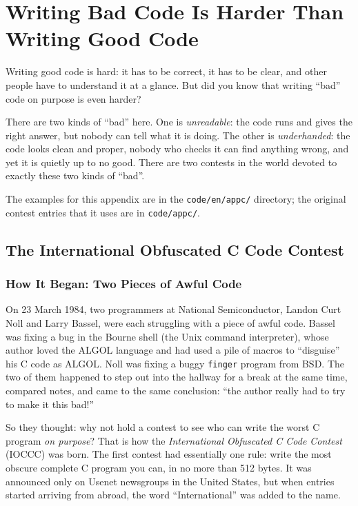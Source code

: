 \chapter{Writing Bad Code Is Harder Than Writing Good Code}
\label{app:evil-code}

Writing good code is hard: it has to be correct, it has to be clear, and other people have to understand it at a glance. But did you know that writing ``bad'' code on purpose is even harder?

There are two kinds of ``bad'' here. One is \emph{unreadable}: the code runs and gives the right answer, but nobody can tell what it is doing. The other is \emph{underhanded}: the code looks clean and proper, nobody who checks it can find anything wrong, and yet it is quietly up to no good. There are two contests in the world devoted to exactly these two kinds of ``bad''.

The examples for this appendix are in the \texttt{code/en/appc/} directory; the original contest entries that it uses are in \texttt{code/appc/}.

\section{The International Obfuscated C Code Contest}

\subsection{How It Began: Two Pieces of Awful Code}

On 23 March 1984, two programmers at National Semiconductor, Landon Curt Noll and Larry Bassel, were each struggling with a piece of awful code. Bassel was fixing a bug in the Bourne shell (the Unix command interpreter), whose author loved the ALGOL language and had used a pile of macros to ``disguise'' his C code as ALGOL. Noll was fixing a buggy \texttt{finger} program from BSD. The two of them happened to step out into the hallway for a break at the same time, compared notes, and came to the same conclusion: ``the author really had to try to make it this bad!''

So they thought: why not hold a contest to see who can write the worst C program \emph{on purpose}? That is how the \emph{International Obfuscated C Code Contest} (IOCCC) was born. The first contest had essentially one rule: write the most obscure complete C program you can, in no more than 512 bytes. It was announced only on Usenet newsgroups in the United States, but when entries started arriving from abroad, the word ``International'' was added to the name.

